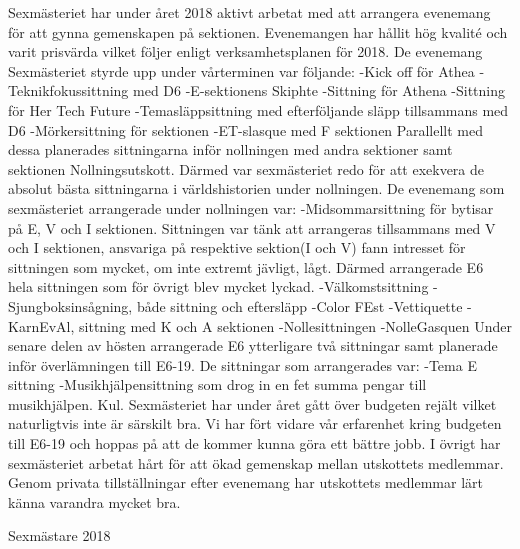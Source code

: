 \documentclass[../_main/handlingar.tex]{subfiles}
\begin{document}

Sexmästeriet har under året 2018 aktivt arbetat med att arrangera evenemang för att gynna
gemenskapen på sektionen. Evenemangen har hållit hög kvalité och varit prisvärda vilket följer enligt
verksamhetsplanen för 2018. De evenemang Sexmästeriet styrde upp under vårterminen var följande:
-Kick off för Athea
-Teknikfokussittning med D6
-E-sektionens Skiphte
-Sittning för Athena
-Sittning för Her Tech Future
-Temasläppsittning med efterföljande släpp tillsammans med D6
-Mörkersittning för sektionen
-ET-slasque med F sektionen
Parallellt med dessa planerades sittningarna inför nollningen med andra sektioner samt sektionen
Nollningsutskott. Därmed var sexmästeriet redo för att exekvera de absolut bästa sittningarna i
världshistorien under nollningen.
De evenemang som sexmästeriet arrangerade under nollningen var:
-Midsommarsittning för bytisar på E, V och I sektionen. Sittningen var tänk att arrangeras
tillsammans med V och I sektionen, ansvariga på respektive sektion(I och V) fann intresset för
sittningen som mycket, om inte extremt jävligt, lågt. Därmed arrangerade E6 hela sittningen som för
övrigt blev mycket lyckad.
-Välkomstsittning
-Sjungboksinsågning, både sittning och eftersläpp
-Color FEst
-Vettiquette
-KarnEvAl, sittning med K och A sektionen
-Nollesittningen
-NolleGasquen
Under senare delen av hösten arrangerade E6 ytterligare två sittningar samt planerade inför
överlämningen till E6-19. De sittningar som arrangerades var:
-Tema E sittning
-Musikhjälpensittning som drog in en fet summa pengar till musikhjälpen. Kul.
Sexmästeriet har under året gått över budgeten rejält vilket naturligtvis inte är särskilt bra. Vi har fört
vidare vår erfarenhet kring budgeten till E6-19 och hoppas på att de kommer kunna göra ett bättre
jobb.
I övrigt har sexmästeriet arbetat hårt för att ökad gemenskap mellan utskottets medlemmar. Genom
privata tillställningar efter evenemang har utskottets medlemmar lärt känna varandra mycket bra.


\begin{signatures}{1}
    \mvh
    \signature{Alexander Wik}{Sexmästare 2018}
\end{signatures}
\end{document}
